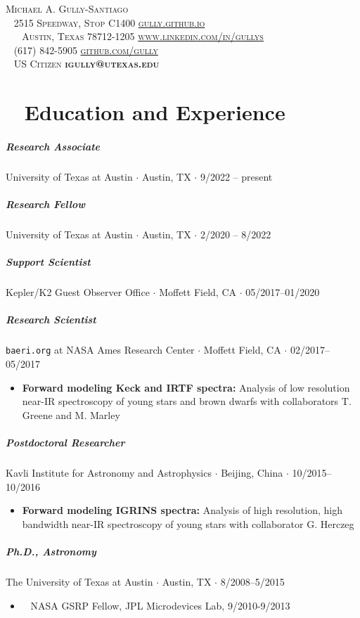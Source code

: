 \documentclass[10pt,letterpaper]{article}
\newcommand{\namestyle}{\Huge \scshape}
\newcommand{\addressstyle}{\color{addresscolor}  \footnotesize \sffamily \upshape}
\begin{document}
\begin{flushleft}
    \namestyle Michael A. Gully-Santiago \\[0.3em]
    \addressstyle
    \faMapMarked* ~ 2515 Speedway, Stop C1400  \hfill \url{gully.github.io} ~ \faLink \\
    ~ ~ Austin, Texas 78712-1205  \hfill  \url{www.linkedin.com/in/gullys} ~ \faLinkedinIn \\
    \faPhone ~ (617) 842-5905 \hfill \url{github.com/gully} ~ \faGithub \\
    \faFlagUsa ~ US Citizen \hfill \textbf{igully@utexas.edu} ~ \faAt\\

\end{flushleft}

\small

\section*{\faUniversity ~ Education and Experience}

\subparagraph{Research Associate}
University of Texas at Austin $\cdot$ Austin, TX $\cdot$  9/2022 -- present

\subparagraph{Research Fellow}
University of Texas at Austin $\cdot$ Austin, TX $\cdot$  2/2020 -- 8/2022

\subparagraph{Support Scientist}
Kepler/K2 Guest Observer Office $\cdot$ Moffett Field, CA $\cdot$ 05/2017--01/2020

\subparagraph{Research Scientist}
\texttt{baeri.org} at NASA Ames Research Center $\cdot$ Moffett Field, CA $\cdot$ 02/2017--05/2017
\begin{itemize}
    \item  \textbf{Forward modeling Keck and IRTF spectra:} Analysis of low resolution near-IR spectroscopy of young stars and brown dwarfs with collaborators T. Greene and M. Marley
\end{itemize}

\subparagraph{Postdoctoral Researcher}
Kavli Institute for Astronomy and Astrophysics $\cdot$ Beijing, China $\cdot$ 10/2015--10/2016
\begin{itemize}
    \item  \textbf{Forward modeling IGRINS spectra:} Analysis of high resolution, high bandwidth near-IR spectroscopy of young stars with collaborator G. Herczeg
\end{itemize}


\subparagraph{\textbf{Ph.D}., Astronomy}
The University of Texas at Austin $\cdot$ Austin, TX $\cdot$ 8/2008--5/2015
\begin{itemize}
    \item \faRocket ~ NASA GSRP Fellow, JPL Microdevices Lab, 9/2010-9/2013
\end{itemize}
\end{document}
